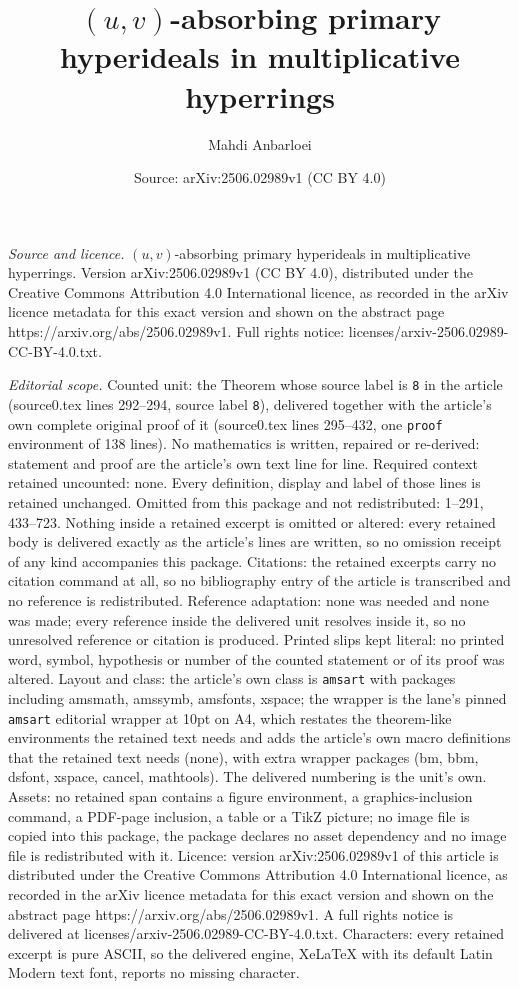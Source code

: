 \documentclass[10pt,a4paper]{amsart}
\title[$(u,v)$-absorbing primary hyperideals in multiplicative hype]{$(u,v)$-absorbing primary hyperideals in multiplicative hyperrings}
\author{Mahdi Anbarloei}
\date{Source: arXiv:2506.02989v1 (CC BY 4.0)}
\begin{document}
\maketitle

\noindent\emph{Source and licence.} $(u,v)$-absorbing primary hyperideals in multiplicative hyperrings. Version arXiv:2506.02989v1 (CC BY 4.0), distributed under the Creative Commons Attribution 4.0 International licence, as recorded in the arXiv licence metadata for this exact version and shown on the abstract page https://arxiv.org/abs/2506.02989v1. Full rights notice: licenses/arxiv-2506.02989-CC-BY-4.0.txt.\par\smallskip

\noindent\textit{Editorial scope.} Counted unit: the Theorem whose source label is \texttt{8} in the article (source0.tex lines 292--294, source label \texttt{8}), delivered together with the article's own complete original proof of it (source0.tex lines 295--432, one \texttt{proof} environment of 138 lines). No mathematics is written, repaired or re-derived: statement and proof are the article's own text line for line. Required context retained uncounted: none. Every definition, display and label of those lines is retained unchanged. Omitted from this package and not redistributed: 1--291, 433--723. Nothing inside a retained excerpt is omitted or altered: every retained body is delivered exactly as the article's lines are written, so no omission receipt of any kind accompanies this package. Citations: the retained excerpts carry no citation command at all, so no bibliography entry of the article is transcribed and no reference is redistributed. Reference adaptation: none was needed and none was made; every reference inside the delivered unit resolves inside it, so no unresolved reference or citation is produced. Printed slips kept literal: no printed word, symbol, hypothesis or number of the counted statement or of its proof was altered. Layout and class: the article's own class is \texttt{amsart} with packages including amsmath, amssymb, amsfonts, xspace; the wrapper is the lane's pinned \texttt{amsart} editorial wrapper at 10pt on A4, which restates the theorem-like environments the retained text needs and adds the article's own macro definitions that the retained text needs (none), with extra wrapper packages (bm, bbm, dsfont, xspace, cancel, mathtools). The delivered numbering is the unit's own. Assets: no retained span contains a figure environment, a graphics-inclusion command, a PDF-page inclusion, a table or a TikZ picture; no image file is copied into this package, the package declares no asset dependency and no image file is redistributed with it. Licence: version arXiv:2506.02989v1 of this article is distributed under the Creative Commons Attribution 4.0 International licence, as recorded in the arXiv licence metadata for this exact version and shown on the abstract page https://arxiv.org/abs/2506.02989v1. A full rights notice is delivered at licenses/arxiv-2506.02989-CC-BY-4.0.txt. Characters: every retained excerpt is pure ASCII, so the delivered engine, XeLaTeX with its default Latin Modern text font, reports no missing character.
\end{document}
